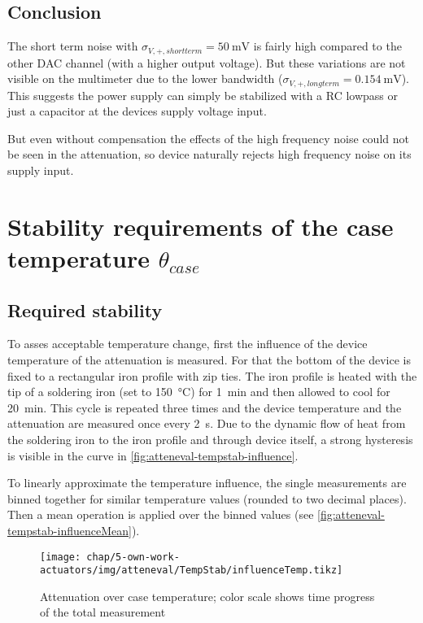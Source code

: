 \FloatBarrier
\subsection{Conclusion}
The short term noise with $\sigma_{V,+,shortterm} = \SI{50}{\milli\volt}$ is fairly high compared to the other DAC channel (with a higher output voltage). But these variations are not visible on the multimeter due to the lower bandwidth ($\sigma_{V,+,longterm} = \SI{0.154}{\milli\volt}$). This suggests the power supply can simply be stabilized with a RC lowpass or just a capacitor at the devices supply voltage input.

But even without compensation the effects of the high frequency noise could not be seen in the attenuation, so device naturally rejects high frequency noise on its supply input.

\FloatBarrier
\section{Stability requirements of the case temperature $\theta_{case}$}
\subsection{Required stability}
To asses acceptable temperature change, first the influence of the device temperature of the attenuation is measured. For that the bottom of the device is fixed to a rectangular iron profile with zip ties. The iron profile is heated with the tip of a soldering iron (set to \SI{150}{\degreeCelsius}) for \SI{1}{\minute} and then allowed to cool for \SI{20}{\minute}. This cycle is repeated three times and the device temperature and the attenuation are measured once every \SI{2}{\second}. Due to the dynamic flow of heat from the soldering iron to the iron profile and through device itself, a strong hysteresis is visible in the curve in \autoref{fig:atteneval-tempstab-influence}. 

To linearly approximate the temperature influence, the single measurements are binned together for similar temperature values (rounded to two decimal places). Then a mean operation is applied over the binned values (see \autoref{fig:atteneval-tempstab-influenceMean}).

\begin{figure}[tb]
	\centering
	\texttt{[image: chap/5-own-work-actuators/img/atteneval/TempStab/influenceTemp.tikz]}
	\caption{Attenuation over case temperature; color scale shows time progress of the total measurement}
	\label{fig:atteneval-tempstab-influence}
\end{figure}

